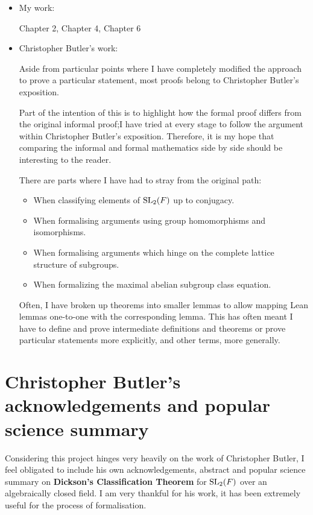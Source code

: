 \begin{itemize}
    \item My work:
    
    Chapter 2, Chapter 4, Chapter 6

    \item Christopher Butler's work:
    
    Aside from particular points where I have completely modified the approach to prove a particular statement, most proofs belong to Christopher Butler's exposition.
    
    Part of the intention of this is to highlight how the formal proof differs from the 
    original informal proof;I have tried at every stage to follow the argument within Christopher Butler's exposition. 
    Therefore, it is my hope that comparing the informal and formal mathematics side by side should be interesting to the reader.

    There are parts where I have had to stray from the original path:
    
    \begin{itemize}
        \item When classifying elements of $\operatorname{SL}_2(F)$ up to conjugacy.
        \item When formalising arguments using group homomorphisms and isomorphisms.
        \item When formalising arguments which hinge on the complete lattice structure of subgroups.
        \item When formalizing the maximal abelian subgroup class equation.
    \end{itemize}
    
    Often, I have broken up theorems into smaller lemmas to allow mapping Lean lemmas one-to-one with the corresponding lemma. 
    This has often meant I have to define and prove intermediate definitions and theorems or prove particular statements more explicitly, and other terms, more generally.
\end{itemize}


\section{Christopher Butler's acknowledgements and popular science summary}

Considering this project hinges very heavily on the work of Christopher Butler, I feel obligated to include his own acknowledgements, abstract and popular science summary on \textbf{Dickson's Classification Theorem} for $\operatorname{SL}_2(F)$ over an algebraically closed field. I am very thankful for his work, it has been
extremely useful for the process of formalisation.

